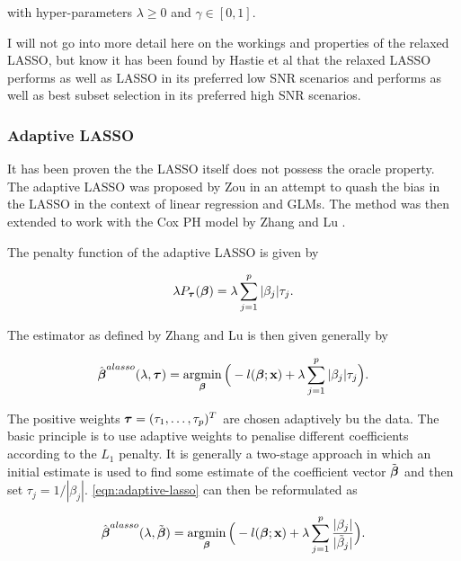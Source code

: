 with hyper-parameters $\lambda\geq0$ and $\gamma\in[0,1]$.

I will not go into more detail here on the workings and properties of the relaxed LASSO, but know it has been found by Hastie et al  that the relaxed LASSO performs as well as LASSO in its preferred low SNR scenarios and performs as well as best subset selection in its preferred high SNR scenarios.

\subsubsection{Adaptive LASSO}

It has been proven the the LASSO itself does not possess the oracle property. The adaptive LASSO was proposed by Zou  in an attempt to quash the bias in the LASSO in the context of linear regression and GLMs. The method was then extended to work with the Cox PH model by Zhang and Lu .

The penalty function of the adaptive LASSO is given by

\begin{equation}
    \lambda P_{\boldsymbol{\tau}}(\boldsymbol{\beta}) = \lambda\sum_{j=1}^p|\beta_j|\tau_j.
\end{equation}

The estimator as defined by Zhang and Lu  is then given generally by

\begin{equation}\label{eqn:adaptive-lasso}
    \hat{\boldsymbol{\beta}}^{alasso}(\lambda,\boldsymbol{\tau})=\operatorname*{argmin}_{\boldsymbol{\beta}}\Big(-l(\boldsymbol{\beta};\textbf{x})+\lambda\sum_{j=1}^p|\beta_j|\tau_j\Big).
\end{equation}

The positive weights $\boldsymbol{\tau}=(\tau_1,\ldots,\tau_p)^T$ are chosen adaptively bu the data. The basic principle is to use adaptive weights to penalise different coefficients according to the $L_1$ penalty. It is generally a two-stage approach in which an initial estimate is used to find some estimate of the coefficient vector $\Tilde{\boldsymbol{\beta}}$ and then set $\tau_j = 1/|\beta_j|$. \cref{eqn:adaptive-lasso} can then be reformulated as

\begin{equation}\label{eqn:adaptive-lasso-reform}
    \hat{\boldsymbol{\beta}}^{alasso}(\lambda,\Tilde{\boldsymbol{\beta}})=\operatorname*{argmin}_{\boldsymbol{\beta}}\Big(-l(\boldsymbol{\beta};\textbf{x})+\lambda\sum_{j=1}^p\frac{|\beta_j|}{|\Tilde{\beta}_j|}\Big).
\end{equation}

